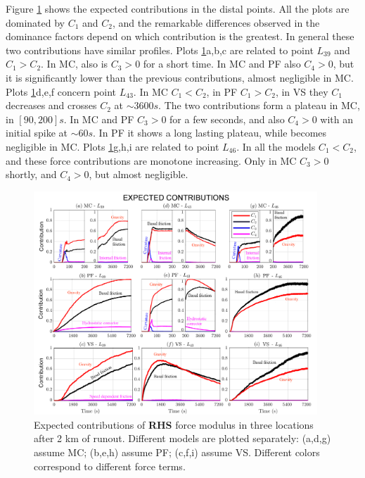 \documentclass{article}
\begin{document}
Figure \ref{fig:Colima-Ci_2} shows the expected contributions in the distal points. All the plots are dominated by $C_1$ and $C_2$, and the remarkable differences observed in the dominance factors depend on which contribution is the greatest. In general these two contributions have similar profiles. Plots \ref{fig:Colima-Ci_2}a,b,c are related to point $L_{39}$ and $C_1>C_2$. In MC, also is $C_3>0$ for a short time. In MC and PF also $C_4>0$, but it is significantly lower than the previous contributions, almost negligible in MC. Plots \ref{fig:Colima-Ci_2}d,e,f concern point $L_{43}$. In MC $C_1<C_2$, in PF $C_1>C_2$, in VS they $C_1$ decreases and crosses $C_2$ at $\sim 3600 s$. The two contributions form a plateau in MC, in $[90, 200] s$. In MC and PF $C_3>0$ for a few seconds, and also $C_4>0$ with an initial spike at $\sim 60s$. In PF it shows a long lasting plateau, while becomes negligible in MC. Plots \ref{fig:Colima-Ci_2}g,h,i are related to point $L_{46}$. In all the models $C_1<C_2$, and these force contributions are monotone increasing. Only in MC $C_3>0$ shortly, and $C_4>0$, but almost negligible.
\begin{figure}[H]
         \centering
        \includegraphics[width=0.95\textwidth]{BAF_VolcanDeColima/ForceContrib/Ci2_total.png}
        \caption{Expected contributions of \textbf{RHS} force modulus in three locations after 2 km of runout. Different models are plotted separately: (a,d,g) assume MC; (b,e,h) assume PF; (c,f,i) assume VS. Different colors correspond to different force terms.}
        \label{fig:Colima-Ci_2}
\end{figure}
\end{document}
